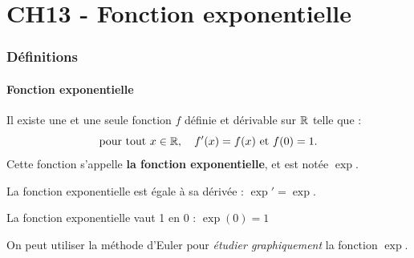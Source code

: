\documentclass[a4paper,11pt]{article}
\author{Pierquet}
\title{\nomfichier}
\begin{document}
\pagestyle{fancy}

\part{CH13 - Fonction exponentielle}

\section{Définitions}

\subsection{Fonction exponentielle}

\begin{cdefi}
Il existe une et une seule fonction $f$ définie et dérivable sur $\R$ telle que : \[\text{pour tout } x \in \R, \quad f'(x)=f(x) \text{ et } f(0)=1.\]%
Cette fonction s'appelle \textbf{la fonction exponentielle}, et est notée $\exp$.
\end{cdefi}

\begin{cprop}
La fonction exponentielle est égale à sa dérivée : $\exp'=\exp$.

La fonction exponentielle vaut 1 en 0 : $\exp(0)=1$
\end{cprop}

\begin{crmq}
On peut utiliser la \og méthode d'Euler \fg{} pour \textit{étudier graphiquement} la fonction $\exp$.
\end{crmq}
\end{document}
